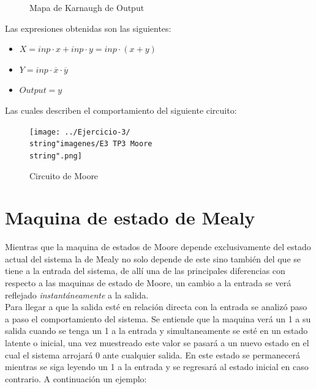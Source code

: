 \begin{figure}[H]
\centering
	\begin{Karnaughquatre}
	\end{Karnaughquatre}

\caption{Mapa de Karnaugh de Output}
\end{figure}

Las expresiones obtenidas son las siguientes:\\
\begin{itemize}
\item $X=inp\cdot x+inp\cdot y=inp\cdot(x+y)$
\item $Y=inp\cdot\overline{x}\cdot\overline{y}$
\item $Output=y$
\end{itemize}
Las cuales describen el comportamiento del siguiente circuito:\\

\begin{figure}[H]
\begin{centering}
\texttt{[image: ../Ejercicio-3/\\string"imagenes/E3 TP3 Moore\\string".png]}
\par\end{centering}
\caption{Circuito de Moore}
\end{figure}


\section{Maquina de estado de Mealy}

Mientras que la maquina de estados de Moore depende exclusivamente del estado actual del sistema la de Mealy no solo depende de este sino también del que se tiene a la entrada del sistema, de allí una de las principales diferencias con respecto a las maquinas de estado de Moore, un cambio a la entrada se verá reflejado \emph{instantáneamente} a la salida.\\

Para llegar a que la salida esté en relación directa con la entrada se analizó paso a paso el comportamiento del sistema. Se entiende que la maquina verá un 1 a su salida cuando se tenga un 1 a la entrada y simultaneamente se esté en un estado latente o inicial, una vez muestreado este valor se pasará a un nuevo estado en el cual el sistema arrojará 0 ante cualquier salida. En este estado se permanecerá mientras se siga leyendo un 1 a la entrada y se regresará al estado inicial en
caso contrario. A continuación un ejemplo:\\


